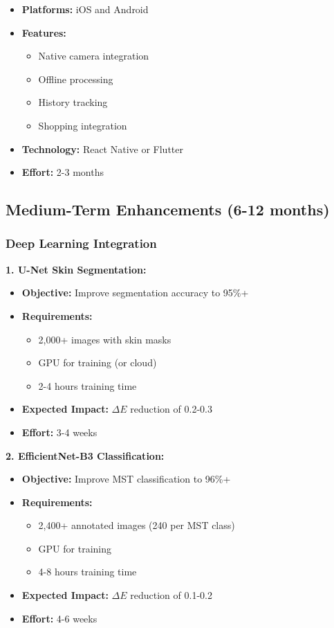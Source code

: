 \begin{itemize}
    \item \textbf{Platforms:} iOS and Android
    \item \textbf{Features:}
    \begin{itemize}
        \item Native camera integration
        \item Offline processing
        \item History tracking
        \item Shopping integration
    \end{itemize}
    \item \textbf{Technology:} React Native or Flutter
    \item \textbf{Effort:} 2-3 months
\end{itemize}

\subsection{Medium-Term Enhancements (6-12 months)}

\subsubsection{Deep Learning Integration}

\textbf{1. U-Net Skin Segmentation:}
\begin{itemize}
    \item \textbf{Objective:} Improve segmentation accuracy to 95\%+
    \item \textbf{Requirements:}
    \begin{itemize}
        \item 2,000+ images with skin masks
        \item GPU for training (or cloud)
        \item 2-4 hours training time
    \end{itemize}
    \item \textbf{Expected Impact:} $\Delta E$ reduction of 0.2-0.3
    \item \textbf{Effort:} 3-4 weeks
\end{itemize}

\textbf{2. EfficientNet-B3 Classification:}
\begin{itemize}
    \item \textbf{Objective:} Improve MST classification to 96\%+
    \item \textbf{Requirements:}
    \begin{itemize}
        \item 2,400+ annotated images (240 per MST class)
        \item GPU for training
        \item 4-8 hours training time
    \end{itemize}
    \item \textbf{Expected Impact:} $\Delta E$ reduction of 0.1-0.2
    \item \textbf{Effort:} 4-6 weeks
\end{itemize}

